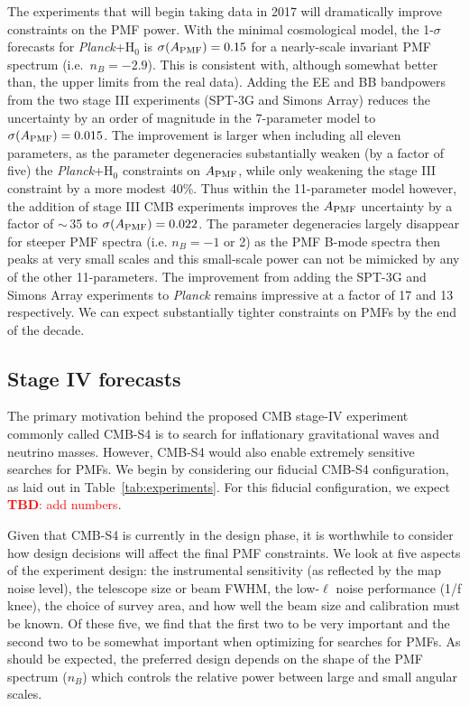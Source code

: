 \documentclass[apj]{emulateapj}
\newcommand{\apmf}{\ensuremath{A_{\rm PMF}}}
\newcommand{\ho}{H\ensuremath{_0}}
\newcommand{\planck}{{\sl Planck}}
\newcommand{\sptnew}{SPT-3G}
\newcommand{\simons}{Simons Array}
\newcommand{\tbd}[1]{\textcolor{Red}{{\bf TBD}: #1}}
\begin{document}
The experiments that will begin taking data in 2017 will dramatically improve constraints on the PMF power. 
With the minimal cosmological model, the 1-$\sigma$ forecasts for \planck{}+\ho{} is $\sigma(\apmf)=\fisherAplk$ for a nearly-scale invariant PMF spectrum (i.e.~$n_B=-2.9$). 
This is consistent with, although somewhat better than, the upper limits from the real data).  
Adding the EE and BB bandpowers from the two stage III experiments (\sptnew{} and \simons{}) reduces the uncertainty by an order of magnitude in the 7-parameter model to $\sigma(\apmf)=0.015$. 
The improvement is larger when including all eleven parameters, as the parameter degeneracies substantially weaken (by a factor of five) the \planck+\ho{} constraints on \apmf{}, while only weakening the stage III constraint by a  more modest 40\%. 
Thus within the 11-parameter model however,  the addition of stage III CMB experiments improves the \apmf{} uncertainty by a factor of $\sim$\,35 to  $\sigma(\apmf)=0.022$. 
The parameter degeneracies largely disappear for steeper PMF spectra (i.e. $n_B=-1$ or 2) as the PMF B-mode spectra then peaks at very small scales and this small-scale power can not be mimicked by any of the other 11-parameters. 
The improvement from adding the SPT-3G and Simons Array experiments to \planck{} remains impressive at a factor of 17 and 13 respectively. 
We can expect substantially tighter constraints on PMFs by the end of the decade. 

\subsection{Stage IV forecasts}

The primary motivation behind the proposed CMB stage-IV experiment commonly called CMB-S4 is to search for inflationary gravitational waves and neutrino masses.
However, CMB-S4 would also enable extremely sensitive searches for PMFs. 
We begin by considering our fiducial CMB-S4 configuration, as laid out in Table~\ref{tab:experiments}. 
For this fiducial configuration, we expect \tbd{add numbers}. 


Given that CMB-S4 is currently in the design phase, it is worthwhile to consider how design decisions will affect the final PMF constraints. 
We look at five aspects of the experiment design: the instrumental sensitivity (as reflected by the map noise level), the telescope size or beam FWHM,  the low-$\ell$ noise performance (1/f knee), the choice of survey area,  and how well the beam size and calibration must be known. 
Of these five, we find that the first two to be very important and the second two to be somewhat important when optimizing for searches for PMFs. 
As should be expected, the preferred design depends on the shape of the PMF spectrum ($n_B$) which controls  the relative power between large and small angular scales. 
\end{document}
